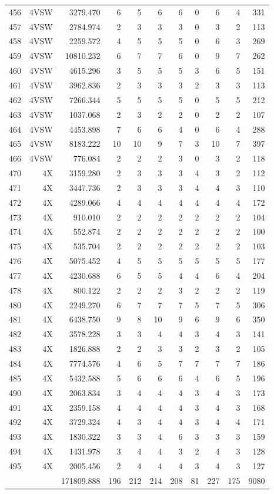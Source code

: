 \documentclass[12pt]{article}\usepackage[]{graphicx}\usepackage[]{color}
\begin{document}
\begin{landscape}
\begin{longtable}[t]{crrrrrrrrrr}
456 & 4VSW & 3279.470 & 6 & 5 & 6 & 6 & 0 & 6 & 4 & 331\\
457 & 4VSW & 2784.974 & 2 & 3 & 3 & 3 & 0 & 3 & 2 & 113\\
458 & 4VSW & 2259.572 & 4 & 5 & 5 & 5 & 0 & 6 & 3 & 269\\
459 & 4VSW & 10810.232 & 6 & 7 & 7 & 6 & 0 & 9 & 7 & 262\\
460 & 4VSW & 4615.296 & 3 & 5 & 5 & 5 & 3 & 6 & 5 & 151\\
461 & 4VSW & 3962.836 & 2 & 3 & 3 & 3 & 2 & 3 & 3 & 113\\
462 & 4VSW & 7266.344 & 5 & 5 & 5 & 5 & 0 & 5 & 5 & 212\\
463 & 4VSW & 1037.068 & 2 & 3 & 2 & 2 & 0 & 2 & 2 & 107\\
464 & 4VSW & 4453.898 & 7 & 6 & 6 & 4 & 0 & 6 & 4 & 288\\
465 & 4VSW & 8183.222 & 10 & 10 & 9 & 7 & 3 & 10 & 7 & 397\\
466 & 4VSW & 776.084 & 2 & 2 & 2 & 3 & 0 & 3 & 2 & 118\\
470 & 4X & 3159.280 & 2 & 3 & 3 & 3 & 4 & 3 & 2 & 112\\
471 & 4X & 3447.736 & 2 & 3 & 3 & 3 & 4 & 4 & 3 & 110\\
472 & 4X & 4289.066 & 4 & 4 & 4 & 4 & 4 & 4 & 4 & 172\\
473 & 4X & 910.010 & 2 & 2 & 2 & 2 & 2 & 2 & 2 & 104\\
474 & 4X & 552.874 & 2 & 2 & 2 & 2 & 2 & 2 & 2 & 100\\
475 & 4X & 535.704 & 2 & 2 & 2 & 2 & 2 & 2 & 2 & 103\\
476 & 4X & 5075.452 & 4 & 5 & 5 & 5 & 5 & 5 & 5 & 177\\
477 & 4X & 4230.688 & 6 & 5 & 5 & 4 & 4 & 6 & 4 & 204\\
478 & 4X & 800.122 & 2 & 2 & 2 & 3 & 2 & 2 & 2 & 119\\
480 & 4X & 2249.270 & 6 & 7 & 7 & 7 & 5 & 7 & 5 & 306\\
481 & 4X & 6438.750 & 9 & 8 & 10 & 9 & 6 & 9 & 6 & 350\\
482 & 4X & 3578.228 & 3 & 3 & 4 & 4 & 3 & 4 & 3 & 141\\
483 & 4X & 1826.888 & 2 & 2 & 3 & 3 & 2 & 3 & 2 & 105\\
484 & 4X & 7774.576 & 4 & 6 & 5 & 7 & 7 & 7 & 7 & 186\\
485 & 4X & 5432.588 & 5 & 6 & 6 & 6 & 4 & 6 & 5 & 196\\
490 & 4X & 2063.834 & 3 & 4 & 4 & 4 & 3 & 4 & 3 & 173\\
491 & 4X & 2359.158 & 4 & 4 & 4 & 4 & 3 & 4 & 3 & 168\\
492 & 4X & 3729.324 & 4 & 3 & 4 & 4 & 3 & 4 & 4 & 171\\
493 & 4X & 1830.322 & 3 & 3 & 4 & 6 & 3 & 3 & 3 & 159\\
494 & 4X & 1431.978 & 3 & 4 & 4 & 3 & 2 & 4 & 3 & 128\\
495 & 4X & 2005.456 & 2 & 4 & 4 & 4 & 3 & 4 & 3 & 127\\
 &  & 171809.888 & 196 & 212 & 214 & 208 & 81 & 227 & 175 & 9080\\*
\end{longtable}
\end{landscape}
\end{document}
